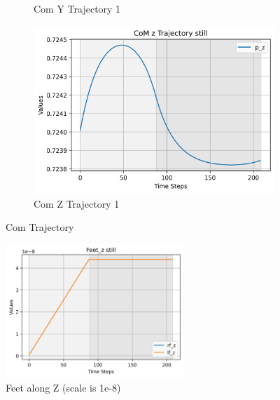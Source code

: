 \documentclass[main.tex]{subfiles}
\begin{document}
\begin{figure}[H]
\begin{subfigure}[b]{0.45\textwidth}
        \caption{Com Y Trajectory 1}
        \label{fig:sub2_still}
    \end{subfigure}
    \hfill
    \begin{subfigure}[b]{0.45\textwidth}
        \centering
        \includegraphics[width=\textwidth]{figures/CoM z Trajectory still.png}
        \caption{Com Z Trajectory 1}
        \label{fig:sub3_still}
    \end{subfigure}
    \caption{Com Trajectory}
    \label{fig:threeimages_still}
\end{figure}

\begin{figure}[htbp]
    \centering
    \includegraphics[width=0.6\textwidth]{figures/Feet_z still.png}
    \caption{Feet along Z (scale is 1e-8)}
    \label{fig:feet_still}
\end{figure}
\end{document}
